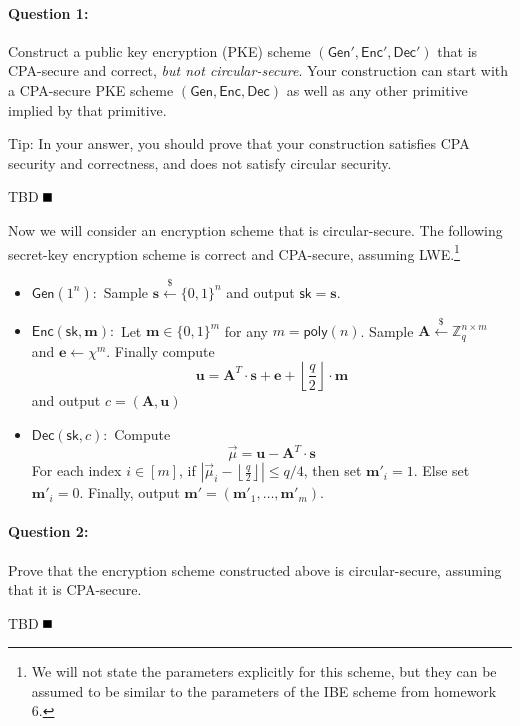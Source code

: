 \documentclass[11pt]{article}
\newenvironment{solution}{\color{blue}\noindent{\bf Solution}\hspace*{1em}}{\qed\medskip}
\newcommand{\qed}{\mbox{}\hspace*{\fill}\nolinebreak\mbox{$\rule{0.6em}{0.6em}$}} %
\numberwithin{equation}{section}
\newcommand{\bfA}{\mathbf{A}}
\newcommand{\bfe}{\mathbf{e}}
\newcommand{\bfm}{\mathbf{m}}
\newcommand{\bfs}{\mathbf{s}}
\newcommand{\bfu}{\mathbf{u}}
\newcommand{\bbZ}{\mathbb{Z}}
\newcommand{\Gen}{\mathsf{Gen}}
\newcommand{\Enc}{\mathsf{Enc}}
\newcommand{\Dec}{\mathsf{Dec}}
\newcommand{\sk}{\mathsf{sk}}
\newcommand{\poly}{\mathsf{poly}}
\newcommand{\getsr}{\stackrel{\$}{\gets}}
\newcommand{\bin}{\{0,1\}}
\newcommand{\bit}{\bin}
\begin{document}
\paragraph{Question 1:} Construct a public key encryption (PKE) scheme $(\Gen', \Enc', \Dec')$ that is CPA-secure and correct, \textit{but not circular-secure}. Your construction can start with a CPA-secure PKE scheme $(\Gen, \Enc, \Dec)$ as well as any other primitive implied by that primitive.

Tip: In your answer, you should prove that your construction satisfies CPA security and correctness, and does not satisfy circular security.

\vspace{5mm}
\begin{solution}
TBD
\end{solution}

\vspace{5mm}
Now we will consider an encryption scheme that is circular-secure. The following secret-key encryption scheme is correct and CPA-secure, assuming LWE.\footnote{We will not state the parameters explicitly for this scheme, but they can be assumed to be similar to the parameters of the IBE scheme from homework 6.}

\begin{itemize}
    \item $\Gen(1^n):$ Sample $\bfs \getsr \bit^n$ and output $\sk = \bfs$.
    \item $\Enc(\sk, \bfm):$ Let $\bfm \in \bit^m$ for any $m = \poly(n)$. Sample $\bfA \getsr \bbZ_q^{n \times m}$ and $\bfe \gets \chi^m$. Finally compute 
    \[\bfu = \bfA^T \cdot \bfs + \bfe + \left\lfloor \frac{q}{2} \right\rfloor \cdot \bfm\]
    and output $c = \left(\bfA, \bfu\right)$
    \item $\Dec(\sk, c):$ Compute 
    \[\vec{\mu} = \bfu - \bfA^T \cdot \bfs\]
    For each index $i \in [m]$, if $\left|\vec{\mu}_i - \left\lfloor \frac{q}{2}\right\rfloor\right| \leq q/4$, then set $\bfm'_i = 1$. Else set $\bfm'_i = 0$. Finally, output $\bfm' = (\bfm'_1, \dots, \bfm'_m)$.
\end{itemize}

\paragraph{Question 2:} Prove that the encryption scheme constructed above is circular-secure, assuming that it is CPA-secure.

\vspace{5mm}
\begin{solution}
TBD
\end{solution}



\end{document}
